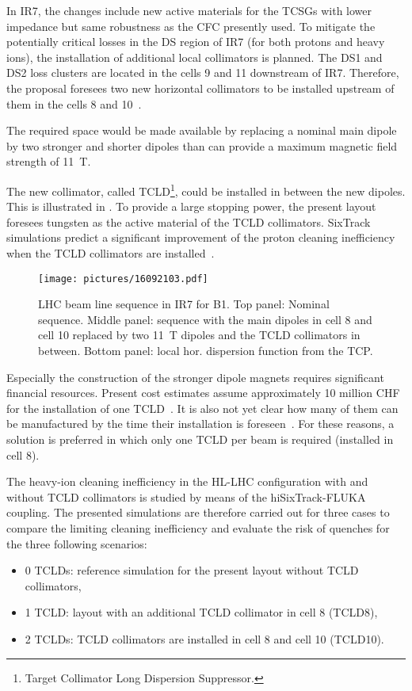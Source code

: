 In IR7, the changes include new active materials for the TCSGs with lower impedance but same robustness as the CFC presently used. To mitigate the potentially critical losses in the DS region of IR7 (for both protons and heavy ions), the installation of additional local collimators is planned. The DS1 and DS2 loss clusters are located in the cells 9 and 11 downstream of IR7. Therefore, the proposal foresees two new horizontal collimators to be installed  upstream of them in the cells 8 and 10~\cite{hb08:wgd08,Bruce2014}. 

The required space would be made available by replacing a nominal main dipole by two stronger and shorter dipoles than can provide a maximum magnetic field strength of 11~T. 

The new collimator, called TCLD\footnote{Target Collimator Long Dispersion Suppressor.}, could be installed in between the new dipoles. This is illustrated in . To provide a large stopping power, the present layout foresees tungsten as the active material of the TCLD collimators. SixTrack simulations predict a significant improvement of the proton cleaning inefficiency when the TCLD collimators are installed~\cite{Bruce2014}.


\begin{figure}[t]  
    \centering
    \texttt{[image: pictures/16092103.pdf]}
    \caption{LHC beam line sequence in IR7 for B1. Top panel: Nominal sequence. Middle panel: sequence with the main dipoles in cell 8 and cell 10 replaced by two 11~T dipoles and the TCLD collimators in between. Bottom panel: local hor. dispersion function from the TCP.}  
    \label{pic:16042602}
\end{figure}

Especially the construction of the stronger dipole magnets requires significant financial resources. Present cost estimates assume approximately 10 million CHF for the installation of one TCLD~\cite{Redaelli:private}. It is also not yet clear how many of them can be manufactured by the time their installation is foreseen~\cite{Redaelli:private}. For these reasons, a solution is preferred in which only one TCLD per beam is required (installed in cell 8). 


The heavy-ion cleaning inefficiency in the HL-LHC configuration with and without TCLD collimators is studied by means of the hiSixTrack-FLUKA coupling. The presented simulations are therefore carried out for three cases to compare the limiting cleaning inefficiency and evaluate the risk of quenches for the three following scenarios:
%
\begin{itemize}
  \item 0 TCLDs: reference simulation for the present layout without TCLD collimators,
  \item 1 TCLD:  layout with an additional TCLD collimator in cell 8 (TCLD8), 
  \item 2 TCLDs: TCLD collimators are installed in cell 8 and cell 10 (TCLD10). 
\end{itemize}
%

